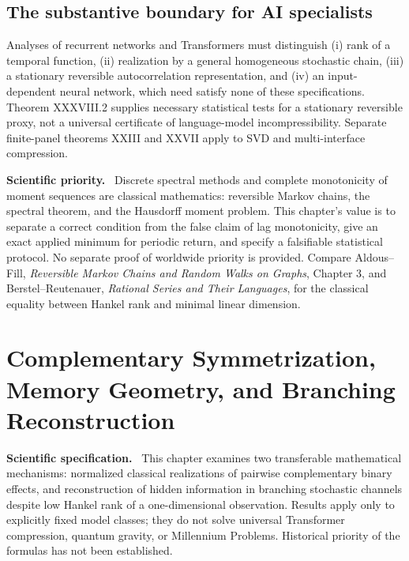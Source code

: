 \documentclass[11pt,a4paper,oneside]{book}
\newcommand{\note}[1]{\par\medskip\noindent\textbf{#1}\ }
\begin{document}
\section{The substantive boundary for AI specialists}
Analyses of recurrent networks and Transformers must distinguish (i) rank of a temporal function, (ii) realization by a general homogeneous stochastic chain, (iii) a stationary reversible autocorrelation representation, and (iv) an input-dependent neural network, which need satisfy none of these specifications. Theorem XXXVIII.2 supplies necessary statistical tests for a stationary reversible proxy, not a universal certificate of language-model incompressibility. Separate finite-panel theorems XXIII and XXVII apply to SVD and multi-interface compression.
\note{Scientific priority.} Discrete spectral methods and complete monotonicity of moment sequences are classical mathematics: reversible Markov chains, the spectral theorem, and the Hausdorff moment problem. This chapter's value is to separate a correct condition from the false claim of lag monotonicity, give an exact applied minimum for periodic return, and specify a falsifiable statistical protocol. No separate proof of worldwide priority is provided. Compare Aldous--Fill, \emph{Reversible Markov Chains and Random Walks on Graphs}, Chapter 3, and Berstel--Reutenauer, \emph{Rational Series and Their Languages}, for the classical equality between Hankel rank and minimal linear dimension.

\chapter{Complementary Symmetrization, Memory Geometry, and Branching Reconstruction}
\note{Scientific specification.} This chapter examines two transferable mathematical mechanisms: normalized classical realizations of pairwise complementary binary effects, and reconstruction of hidden information in branching stochastic channels despite low Hankel rank of a one-dimensional observation. Results apply only to explicitly fixed model classes; they do not solve universal Transformer compression, quantum gravity, or Millennium Problems. Historical priority of the formulas has not been established.
\end{document}
